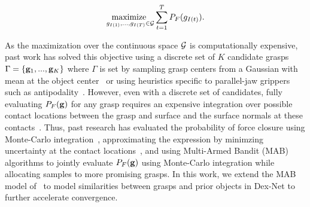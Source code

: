 \vspace{-2ex}
\begin{align}
	\underset{g_{I(1)}, ..., g_{I(T)} \in \mathcal{G}}{\text{maximize }} \sum \limits_{t=1}^T P_F(g_{I(t)}). \label{eq:objective}
\end{align}

As the maximization over the continuous space $\mathcal{G}$ is computationally expensive, past work has solved this objective using a discrete set of $K$ candidate grasps $\Gamma = \left\{ \mathbf{g}_1, ..., \mathbf{g}_K \right\}$ where $\Gamma$ is set by sampling grasp centers from a Gaussian with mean at the object center~\cite{laskey2015bandits} or using heuristics specific to parallel-jaw grippers such as antipodality~\cite{mahler2015gp}.
However, even with a discrete set of candidates, fully evaluating $P_F(\mathbf{g})$ for any grasp requires an expensive integration over possible contact locations between the grasp and surface and the surface normals at these contacts~\cite{mahler2015gp}.
Thus, past research has evaluated the probability of force closure using Monte-Carlo integration~\cite{kehoe2012estimating, kehoe2012toward, weisz2012pose}, approximating the expression by minimzing uncertainty at the contact locations~\cite{mahler2015gp}, and using Multi-Armed Bandit (MAB) algorithms to jointly evaluate $P_F(\mathbf{g})$ using Monte-Carlo integration while allocating samples to more promising grasps.
In this work, we extend the MAB model of~\cite{laskey2015bandits} to model similarities between grasps and prior objects in Dex-Net to further accelerate convergence.

